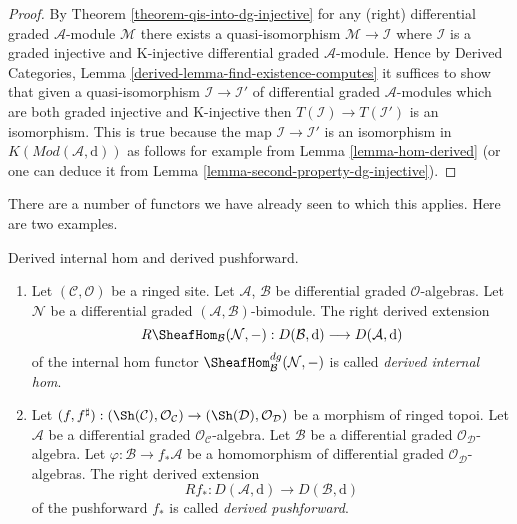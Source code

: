 \begin{proof}
By Theorem \ref{theorem-qis-into-dg-injective}
for any (right) differential graded $\mathcal{A}$-module
$\mathcal{M}$ there exists a quasi-isomorphism
$\mathcal{M} \to \mathcal{I}$ where $\mathcal{I}$
is a graded injective and K-injective
differential graded $\mathcal{A}$-module.
Hence by Derived Categories, Lemma \ref{derived-lemma-find-existence-computes}
it suffices to show that given a quasi-isomorphism
$\mathcal{I} \to \mathcal{I}'$ of differential graded
$\mathcal{A}$-modules which are both
graded injective and K-injective
then $T(\mathcal{I}) \to T(\mathcal{I}')$ is an isomorphism.
This is true because the map $\mathcal{I} \to \mathcal{I}'$
is an isomorphism in $K(\textit{Mod}(\mathcal{A}, \text{d}))$ as follows
for example from Lemma \ref{lemma-hom-derived} (or one can
deduce it from Lemma \ref{lemma-second-property-dg-injective}).
\end{proof}

\noindent
There are a number of functors we have already seen to which this applies.
Here are two examples.

\begin{definition}
\label{definition-pushforward}
Derived internal hom and derived pushforward.
\begin{enumerate}
\item Let $(\mathcal{C}, \mathcal{O})$ be a ringed site. Let
$\mathcal{A}$, $\mathcal{B}$ be differential graded $\mathcal{O}$-algebras.
Let $\mathcal{N}$ be a  differential graded
$(\mathcal{A}, \mathcal{B})$-bimodule. The right derived extension
$$
R\SheafHom_\mathcal{B}(\mathcal{N}, -) :
D(\mathcal{B}, \text{d})
\longrightarrow
D(\mathcal{A}, \text{d})
$$
of the internal hom functor $\SheafHom_\mathcal{B}^{dg}(\mathcal{N}, -)$
is called {\it derived internal hom}.
\item Let $(f, f^\sharp) : (\Sh(\mathcal{C}), \mathcal{O}_\mathcal{C})
\to (\Sh(\mathcal{D}), \mathcal{O}_\mathcal{D})$
be a morphism of ringed topoi. Let $\mathcal{A}$ be a differential
graded $\mathcal{O}_\mathcal{C}$-algebra. Let $\mathcal{B}$ be a
differential graded $\mathcal{O}_\mathcal{D}$-algebra. Let
$\varphi : \mathcal{B} \to f_*\mathcal{A}$ be a homomorphism
of differential graded $\mathcal{O}_\mathcal{D}$-algebras.
The right derived extension
$$
Rf_* :
D(\mathcal{A}, \text{d})
\longrightarrow
D(\mathcal{B}, \text{d})
$$
of the pushforward $f_*$ is called {\it derived pushforward}.
\end{enumerate}
\end{definition}

